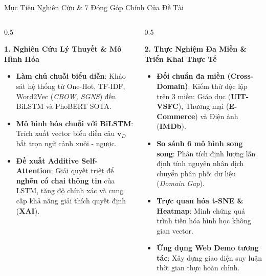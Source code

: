 \documentclass[aspectratio=169, 10pt]{beamer}
\begin{document}
\begin{frame}{Mục Tiêu Nghiên Cứu \& 7 Đóng Góp Chính Của Đề Tài}
  \begin{columns}[t]
    \begin{column}{0.5\textwidth}
      \begin{block}{\small\textbf{1. Nghiên Cứu Lý Thuyết \& Mô Hình Hóa}}
        \fontsize{7.5}{9.5}\selectfont
        \begin{itemize}
          \item \textbf{Làm chủ chuỗi biểu diễn}: Khảo sát hệ thống từ One-Hot, TF-IDF, Word2Vec (\textit{CBOW, SGNS}) đến BiLSTM và PhoBERT SOTA.
          \item \textbf{Mô hình hóa chuỗi với BiLSTM}: Trích xuất vector biểu diễn câu $\mathbf{v}_D$ bắt trọn ngữ cảnh xuôi - ngược.
          \item \textbf{Đề xuất Additive Self-Attention}: Giải quyết triệt để \textbf{nghẽn cổ chai thông tin} của LSTM, tăng độ chính xác và cung cấp khả năng giải thích quyết định (\textbf{XAI}).
        \end{itemize}
      \end{block}
    \end{column}

    \begin{column}{0.5\textwidth}
      \begin{block}{\small\textbf{2. Thực Nghiệm Đa Miền \& Triển Khai Thực Tế}}
        \fontsize{7.5}{9.5}\selectfont
        \begin{itemize}
          \item \textbf{Đối chuẩn đa miền (Cross-Domain)}: Kiểm thử độc lập trên 3 miền: Giáo dục (\textbf{UIT-VSFC}), Thương mại (\textbf{E-Commerce}) và Điện ảnh (\textbf{IMDb}).
          \item \textbf{So sánh 6 mô hình song song}: Phân tích định lượng lẫn định tính nguyên nhân dịch chuyển phân phối dữ liệu (\textit{Domain Gap}).
          \item \textbf{Trực quan hóa t-SNE \& Heatmap}: Minh chứng quá trình tiến hóa hình học không gian vector.
          \item \textbf{Ứng dụng Web Demo tương tác}: Xây dựng giao diện suy luận thời gian thực hoàn chỉnh.
        \end{itemize}
      \end{block}
    \end{column}
  \end{columns}
\end{frame}
\end{document}
